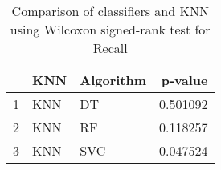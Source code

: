 \begin{table}
\footnotesize
\caption{Comparison of classifiers and KNN using Wilcoxon signed-rank test for Recall}
\label{tab:KNN wilcoxon Recall comparison}
\begin{tabular}{lllr}
\hline
 & KNN & Algorithm & p-value \\
\hline
1 & KNN & DT & 0.501092 \\
2 & KNN & RF & 0.118257 \\
3 & KNN & SVC & 0.047524 \\
\hline
\end{tabular}
\end{table}
